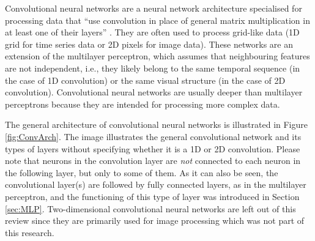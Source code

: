 Convolutional neural networks are a neural network architecture specialised for processing data that ``use convolution in place of general matrix multiplication in at least one of their layers'' \cite{Goodfellow2016}. They are often used to process grid-like data (1D grid for time series data or 2D pixels for image data). These networks are an extension of the multilayer perceptron, which assumes that neighbouring features are not independent, i.e., they likely belong to the same temporal sequence (in the case of 1D convolution) or the same visual structure (in the case of 2D convolution). Convolutional neural networks are usually deeper than multilayer perceptrons because they are intended for processing more complex data.

The general architecture of convolutional neural networks is illustrated in Figure \ref{fig:ConvArch}. The image illustrates the general convolutional network and its types of layers without specifying whether it is a 1D or 2D convolution. Please note that neurons in the convolution layer are \emph{not} connected to each neuron in the following layer, but only to some of them. As it can also be seen, the convolutional layer(s) are followed by fully connected layers, as in the multilayer perceptron, and the functioning of this type of layer was introduced in Section \ref{sec:MLP}. Two-dimensional convolutional neural networks are left out of this review since they are primarily used for image processing which was not part of this research.


